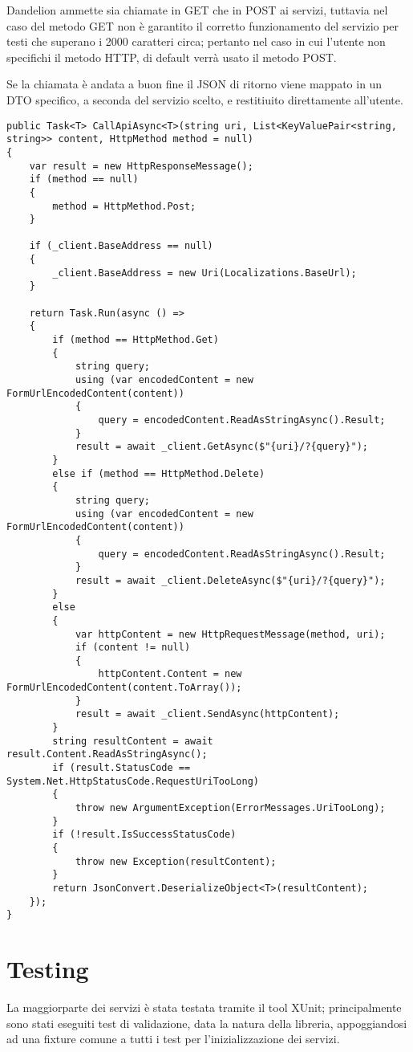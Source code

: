 Dandelion ammette sia chiamate in GET che in POST ai servizi, tuttavia nel caso del metodo GET non è garantito il corretto 
funzionamento del servizio per testi che superano i 2000 caratteri circa; pertanto nel caso in cui l'utente non specifichi il metodo HTTP, di default verrà
usato il metodo POST.

Se la chiamata è andata a buon fine il JSON di ritorno viene mappato in un DTO specifico, a seconda del servizio scelto, e restitiuito direttamente all'utente.

\begin{lstlisting}[style=CSharpStyle]
public Task<T> CallApiAsync<T>(string uri, List<KeyValuePair<string, string>> content, HttpMethod method = null)
{
    var result = new HttpResponseMessage();
    if (method == null)
    {
        method = HttpMethod.Post;
    }

    if (_client.BaseAddress == null)
    {
        _client.BaseAddress = new Uri(Localizations.BaseUrl);
    }

    return Task.Run(async () =>
    {
        if (method == HttpMethod.Get)
        {
            string query;
            using (var encodedContent = new FormUrlEncodedContent(content))
            {
                query = encodedContent.ReadAsStringAsync().Result;
            }
            result = await _client.GetAsync($"{uri}/?{query}");
        }
        else if (method == HttpMethod.Delete)
        {
            string query;
            using (var encodedContent = new FormUrlEncodedContent(content))
            {
                query = encodedContent.ReadAsStringAsync().Result;
            }
            result = await _client.DeleteAsync($"{uri}/?{query}");
        }
        else
        {
            var httpContent = new HttpRequestMessage(method, uri);
            if (content != null)
            {
                httpContent.Content = new FormUrlEncodedContent(content.ToArray());
            }
            result = await _client.SendAsync(httpContent);
        }
        string resultContent = await result.Content.ReadAsStringAsync();
        if (result.StatusCode == System.Net.HttpStatusCode.RequestUriTooLong)
        {
            throw new ArgumentException(ErrorMessages.UriTooLong);
        }
        if (!result.IsSuccessStatusCode)
        {
            throw new Exception(resultContent); 
        }
        return JsonConvert.DeserializeObject<T>(resultContent);
    });
}
\end{lstlisting}

\section{Testing}
La maggiorparte dei servizi è stata testata tramite il tool XUnit; principalmente sono stati eseguiti test di validazione, data la natura della libreria, appoggiandosi 
ad una fixture comune a tutti i test per l'inizializzazione dei servizi.

